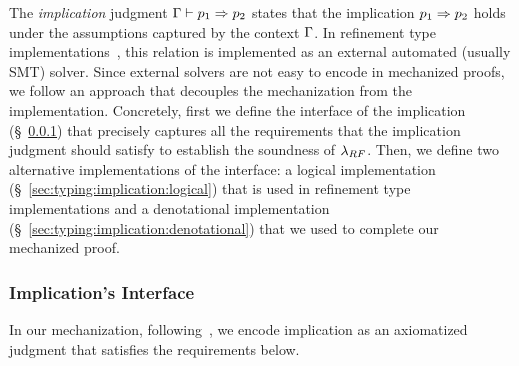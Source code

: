 The \emph{implication} judgment $\imply{\tcenv}{\spred_1}{\spred_2}$
states that the implication $p_1 \Rightarrow p_2$
holds under the assumptions captured by the context $\mathrm{\Gamma}$.
%
In refinement type implementations~\cite{newfstar,Seidel14}, this relation
is implemented as an external automated (usually SMT) solver.
%
Since external solvers are not easy to encode in mechanized proofs,
we follow an approach that decouples the mechanization from the implementation. 
Concretely, 
first we define the interface of the implication (\S~\ref{sec:typing:implication:interface})
that precisely captures all the requirements that the implication 
judgment should satisfy to establish the soundness of $\lambda_{RF}$. 
Then, we define two alternative implementations of the interface: 
a logical implementation (\S~\ref{sec:typing:implication:logical})
that is used in refinement type implementations 
and a denotational implementation (\S~\ref{sec:typing:implication:denotational})
that we used to complete our mechanized proof. 


\subsubsection{Implication's Interface}
\label{sec:typing:implication:interface}
In our mechanization, 
following~\citet{LehmannTanter}, 
we encode implication
as an axiomatized judgment that satisfies the
requirements below.


